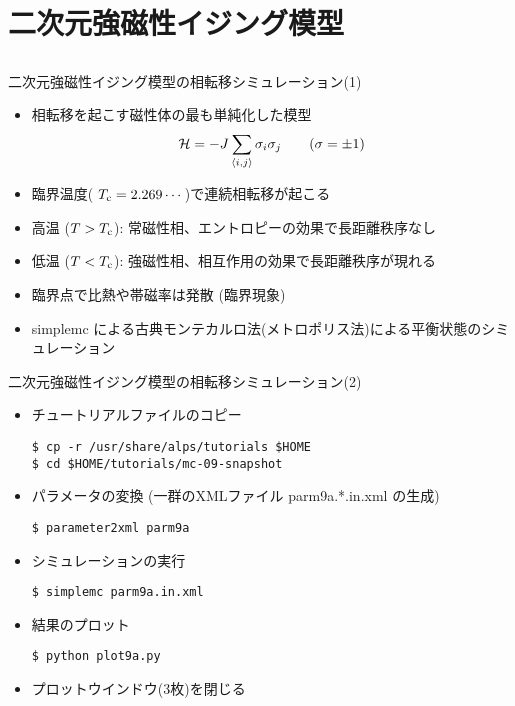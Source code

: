 \section{二次元強磁性イジング模型}
\subsection*{\redb\whiteb\greenm}

\begin{frame}[t,fragile]{二次元強磁性イジング模型の相転移シミュレーション(1)}
  \begin{itemize}
  \item 相転移を起こす磁性体の最も単純化した模型
    \[
      {\cal H} = - J \sum_{\langle i,j \rangle} \sigma_i \sigma_j \qquad (\sigma = \pm 1)
      \]
    \item 臨界温度( $T_{\rm c}=2.269\cdots$)で連続相転移が起こる
    \item 高温 ($T > T_{\rm c}$): 常磁性相、エントロピーの効果で長距離秩序なし
    \item 低温 ($T < T_{\rm c}$): 強磁性相、相互作用の効果で長距離秩序が現れる
    \item 臨界点で比熱や帯磁率は発散 (臨界現象)
    \item simplemc による古典モンテカルロ法(メトロポリス法)による平衡状態のシミュレーション
  \end{itemize}
\end{frame}

\begin{frame}[t,fragile]{二次元強磁性イジング模型の相転移シミュレーション(2)}
  \begin{itemize}
  \item チュートリアルファイルのコピー
\begin{lstlisting}
$ cp -r /usr/share/alps/tutorials $HOME
$ cd $HOME/tutorials/mc-09-snapshot
\end{lstlisting}
  \item パラメータの変換 (一群のXMLファイル parm9a.*.in.xml の生成)
\begin{lstlisting}
$ parameter2xml parm9a
\end{lstlisting}
  \item シミュレーションの実行
\begin{lstlisting}
$ simplemc parm9a.in.xml
\end{lstlisting}
\item 結果のプロット
\begin{lstlisting}
$ python plot9a.py
\end{lstlisting}
\item プロットウインドウ(3枚)を閉じる
  \end{itemize}
\end{frame}

